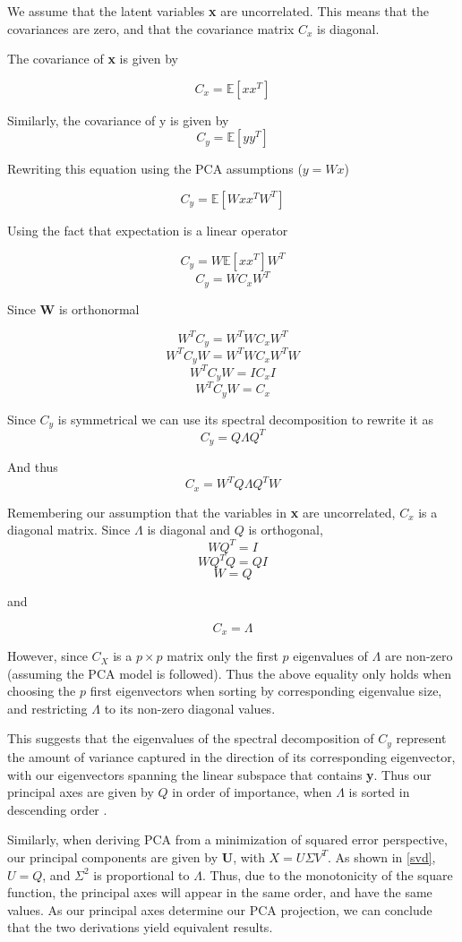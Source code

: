 \documentclass[11pt,a4paper,landscape]{article}
\begin{document}
We assume that the latent variables \textbf{x} are uncorrelated. This means that the covariances are zero, and that the covariance matrix $C_{x} $ is diagonal.

The covariance of \textbf{x} is given by

$$ C_{x} = \mathbb{E}[xx^{T}] $$

Similarly, the covariance of y is given by 
$$ C_{y} = \mathbb{E}[yy^{T}] $$

Rewriting this equation using the PCA assumptions ($y = Wx$)

$$ C_{y} = \mathbb{E}[Wxx^{T}W^{T}] $$

Using the fact that expectation is a linear operator

$$ C_{y} = W\mathbb{E}[xx^{T}]W^{T}$$
$$ C_{y} = WC_{x}W^{T}$$

Since \textbf{W} is orthonormal

$$ W^{T}C_{y} = W^{T}WC_{x}W^{T}$$
$$ W^{T}C_{y}W = W^{T}WC_{x}W^{T}W$$
$$ W^{T}C_{y}W = IC_{x}I$$
$$ W^{T}C_{y}W = C_{x}$$

Since $ C_{y} $ is symmetrical we can use its spectral decomposition to rewrite it as
$$ C_{y} = Q\Lambda Q^{T} $$

And thus
$$C_{x} = W^{T}Q\Lambda Q^{T}W$$

Remembering our assumption that the variables in \textbf{x} are uncorrelated,  $C_{x}$ is a diagonal matrix. Since $\Lambda$ is diagonal and $Q$ is orthogonal, 
$$WQ^{T} = I$$
$$WQ^{T}Q=QI$$
$$W= Q$$

and

$$ C_{x} = \Lambda $$

However, since $C_{X}$ is a $p\times p$ matrix only the first $p$ eigenvalues of $\Lambda$ are non-zero (assuming the PCA model is followed). Thus the above equality only holds when choosing the $p$ first eigenvectors when sorting by corresponding eigenvalue size, and restricting $\Lambda$ to its non-zero diagonal values. \newline

This suggests that the eigenvalues of the spectral decomposition of $C_{y}$ represent the amount of variance captured in the direction of its corresponding eigenvector, with our eigenvectors spanning the linear subspace that contains \textbf{y}. Thus our principal axes are given by $Q$ in order of importance, when $\Lambda$ is sorted in descending order \cite{book}.\newline

Similarly, when deriving PCA from a minimization of squared error perspective, our principal components are given by \textbf{U}, with $X = U\Sigma V^{T}$. As shown in \ref{svd}, $U = Q$, and $\Sigma^2$ is proportional to $\Lambda$. Thus, due to the monotonicity of the square function, the principal axes will appear in the same order, and have the same values. As our principal axes determine our PCA projection, we can conclude that the two derivations yield equivalent results\cite{book}.
\end{document}
